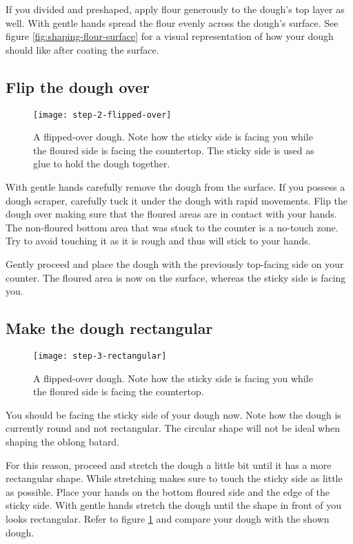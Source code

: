 If you divided and preshaped, apply flour generously to the dough's
top layer as well. With gentle hands spread the flour evenly across
the dough's surface. See figure \ref{fig:shaping-flour-surface} for a
visual representation of how your dough should like after coating
the surface.

\subsection[Flipping the dough]{Flip the dough over}

\begin{figure}[!htb]
  \texttt{[image: step-2-flipped-over]}
  \caption{A flipped-over dough. Note how the sticky side is facing
  you while the floured side is facing the countertop. The sticky side
  is used as glue to hold the dough together.}
\end{figure}

With gentle hands carefully remove the dough from the surface. If
you possess a dough scraper, carefully tuck it under the dough with
rapid movements. Flip the dough over making sure that the floured
areas are in contact with your hands. The non-floured bottom area that was
stuck to the counter is a no-touch zone. Try to avoid touching it
as it is rough and thus will stick to your hands.

Gently proceed and place the dough with the previously top-facing side
on your counter. The floured area is now on the surface, whereas the
sticky side is facing you.

\subsection[Create rectangular shape]{Make the dough rectangular}

\begin{figure}[htb!]
  \texttt{[image: step-3-rectangular]}
  \caption{A flipped-over dough. Note how the sticky side is facing
  you while the floured side is facing the countertop.}
  \label{fig:shaping-rectangular-dough}
\end{figure}

You should be facing the sticky side of your dough now. Note how
the dough is currently round and not rectangular. The circular
shape will not be ideal when shaping the oblong batard.

For this reason, proceed and stretch the dough a little bit until
it has a more rectangular shape. While stretching makes sure to touch
the sticky side as little as possible. Place your hands on the bottom
floured side and the edge of the sticky side. With gentle hands
stretch the dough until the shape in front of you looks rectangular.
Refer to figure \ref{fig:shaping-rectangular-dough} and compare
your dough with the shown dough.

